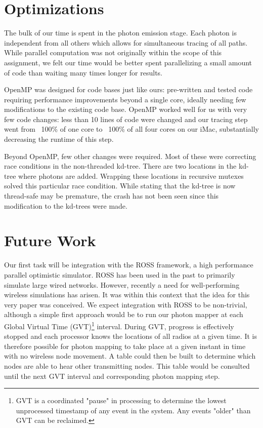 \documentclass[%
        final,
        notitlepage,
        narroweqnarray,
        inline,
        twoside,
        ]{ieee}
\begin{document}
\section{Optimizations}
The bulk of our time is spent in the photon emission stage.  Each photon is
independent from all others which allows for simultaneous tracing of all
paths.  While parallel computation was not originally within the scope of this
assignment, we felt our time would be better spent parallelizing a small amount
of code than waiting many times longer for results.

OpenMP \cite{Grama} was designed for code bases just like ours: pre-written and
tested code requiring performance improvements beyond a single core, ideally
needing few modifications to the existing code base.  OpenMP worked well for
us with very few code changes: less than 10 lines of code were changed and
our tracing step went from ~100\% of one core to ~100\% of all four cores on
our iMac, substantially decreasing the runtime of this step.

Beyond OpenMP, few other changes were required.  Most of these were correcting
race conditions in the non-threaded kd-tree.  There are two locations in the
kd-tree where photons are added.  Wrapping these locations in recursive
mutexes solved this particular race condition.  While stating that the kd-tree
is now thread-safe may be premature, the crash has not been seen since this
modification to the kd-trees were made.

\section{Future Work}

Our first task will be integration with the ROSS \cite{ross} framework, a high
performance parallel optimistic simulator.  ROSS has been used in the past to
primarily simulate large wired networks.  However, recently a need for
well-performing wireless simulations has arisen.  It was within this context
that the idea for this very paper was conceived.  We expect integration with
ROSS to be non-trivial, although a simple first approach would be to run our
photon mapper at each Global Virtual Time (GVT)\footnote{GVT is a coordinated
"pause" in processing to determine the lowest unprocessed timestamp of any
event in the system.  Any events "older" than GVT can be reclaimed.} interval.
During GVT, progress is effectively stopped and each processor knows the
locations of all radios at a given time.  It is therefore possible for photon
mapping to take place at a given instant in time with no wireless node movement.
A table could then be built to determine which nodes are able to hear other
transmitting nodes.  This table would be consulted until the next GVT interval
and corresponding photon mapping step.
\end{document}
